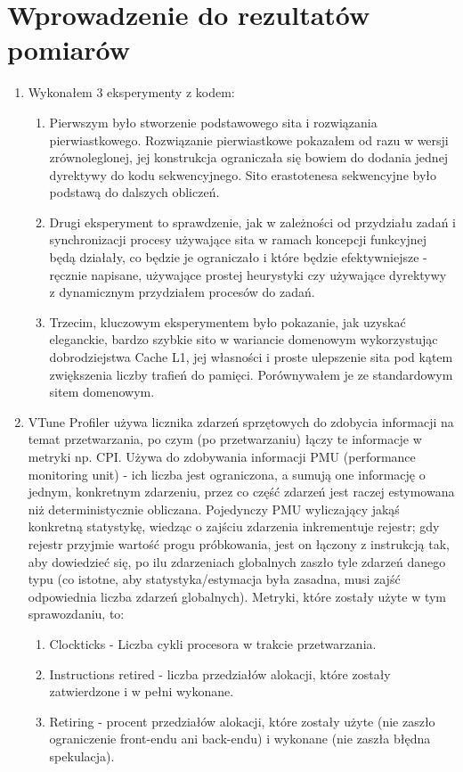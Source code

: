 \documentclass[12pt]{article}
\begin{document}
\section {Wprowadzenie do rezultatów pomiarów}
\begin{enumerate}
	\item Wykonałem 3 eksperymenty z kodem:
	\begin{enumerate}
		\item Pierwszym było stworzenie podstawowego sita i rozwiązania pierwiastkowego. Rozwiązanie pierwiastkowe pokazałem od razu w wersji zrównoleglonej, jej konstrukcja ograniczała się bowiem do dodania jednej dyrektywy do kodu sekwencyjnego. Sito erastotenesa sekwencyjne było podstawą do dalszych obliczeń.
		
		\item Drugi eksperyment to sprawdzenie, jak w zależności od przydziału zadań i synchronizacji procesy używające sita w ramach koncepcji funkcyjnej będą działały, co będzie je ograniczało i które będzie efektywniejsze - ręcznie napisane, używające prostej heurystyki czy używające dyrektywy z dynamicznym przydziałem procesów do zadań.
		\item Trzecim, kluczowym eksperymentem było pokazanie, jak uzyskać eleganckie, bardzo szybkie sito w wariancie domenowym wykorzystując dobrodziejstwa Cache L1, jej własności i proste ulepszenie sita pod kątem zwiększenia liczby trafień do pamięci. Porównywałem je ze standardowym sitem domenowym.
	\end{enumerate}

	\item VTune Profiler używa licznika zdarzeń sprzętowych do zdobycia informacji na temat przetwarzania, po czym (po przetwarzaniu) łączy te informacje w metryki np. CPI. Używa do zdobywania informacji PMU (performance monitoring unit) - ich liczba jest ograniczona, a sumują one informację o jednym, konkretnym zdarzeniu, przez co część zdarzeń jest raczej estymowana niż deterministycznie obliczana. Pojedynczy PMU wyliczający jakąś konkretną statystykę, wiedząc o zajściu zdarzenia inkrementuje rejestr; gdy rejestr przyjmie wartość progu próbkowania, jest on łączony z instrukcją tak, aby dowiedzieć się, po ilu zdarzeniach globalnych zaszło tyle zdarzeń danego typu (co istotne, aby statystyka/estymacja była zasadna, musi zajść odpowiednia liczba zdarzeń globalnych). Metryki, które zostały użyte w tym sprawozdaniu, to: 
	
	\begin{enumerate}
		\item Clockticks - Liczba cykli procesora w trakcie przetwarzania.
		\item Instructions retired - liczba przedziałów alokacji, które zostały zatwierdzone i w pełni wykonane.
		\item Retiring - procent przedziałów alokacji, które zostały użyte (nie zaszło ograniczenie front-endu ani back-endu) i wykonane (nie zaszła błędna spekulacja).
		

\end{enumerate}
\end{enumerate}
\end{document}
